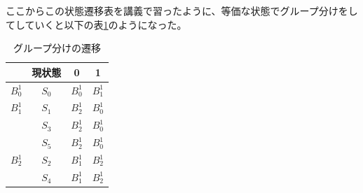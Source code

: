 \documentclass{jsarticle}
\begin{document}
\begin{description}
\begin{description}
            ここからこの状態遷移表を講義で習ったように、等価な状態でグループ分けをしてしていくと以下の表\ref{tab2}のようになった。
            \begin{table}[H]
                \centering
                \caption{グループ分けの遷移}
                \label{tab2}
                \begin{tabular}{|c|c|c|c|} \hline
                    & 現状態 & 0 & 1 \\ \hline
                    $B_0^1$ & $S_0$ & $B_0^1$ & $B_1^1$ \\ \hline
                    $B_1^1$ & $S_1$ & $B_2^1$ & $B_0^1$ \\ \cline{2-4}
                     & $S_3$ & $B_2^1$ & $B_0^1$ \\ \cline{2-4}
                     & $S_5$ & $B_2^1$ & $B_0^1$ \\ \hline
                    $B_2^1$ & $S_2$ & $B_1^1$ & $B_2^1$ \\ \cline{2-4}
                     & $S_4$ & $B_1^1$ & $B_2^1$ \\ \hline
                \end{tabular}
            \end{table}


\end{description}
\end{description}
\end{document}
